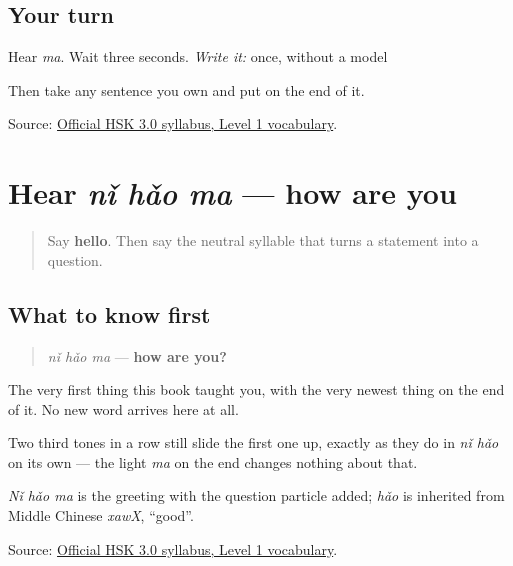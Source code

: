 \subsection*{Your turn}
Hear \emph{ma}. Wait three seconds. \emph{Write it:} \textbf{} once, without a model

Then take any sentence you own and put  on the end of it.

\begin{tcolorbox}[breakable,colback=teal!4,colframe=teal!35!black,title={Before you move on}]
Source: \href{https://hsk.cn-bj.ufileos.com/3.0/\%E6\%96\%B0\%E7\%89\%88HSK\%E8\%80\%83\%E8\%AF\%95\%E5\%A4\%A7\%E7\%BA\%B21219.pdf}{Official HSK 3.0 syllabus, Level 1 vocabulary}.
\end{tcolorbox}
\section[nǐ hǎo ma]{Hear \emph{nǐ hǎo ma} — how are you}

\label{lesson:ZH-C19-hear-nihaoma}



\begin{quote}
Say \textbf{hello}. Then say the neutral syllable that turns a statement into a question.
\end{quote}

\subsection*{What to know first}
\begin{quote}
\emph{nǐ hǎo ma} — \textbf{how are you?}
\end{quote}

The very first thing this book taught you, with the very newest thing on the end of it. No new word arrives here at all.

Two third tones in a row still slide the first one up, exactly as they do in \emph{nǐ hǎo} on its own — the light \emph{ma} on the end changes nothing about that.

\emph{Nǐ hǎo ma} is the greeting with the question particle added; \emph{hǎo} is inherited from Middle Chinese \emph{xawX}, \textquotedblleft{}good\textquotedblright{}.

\begin{tcolorbox}[breakable,colback=teal!4,colframe=teal!35!black,title={Before you move on}]
Source: \href{https://hsk.cn-bj.ufileos.com/3.0/\%E6\%96\%B0\%E7\%89\%88HSK\%E8\%80\%83\%E8\%AF\%95\%E5\%A4\%A7\%E7\%BA\%B21219.pdf}{Official HSK 3.0 syllabus, Level 1 vocabulary}.
\end{tcolorbox}
